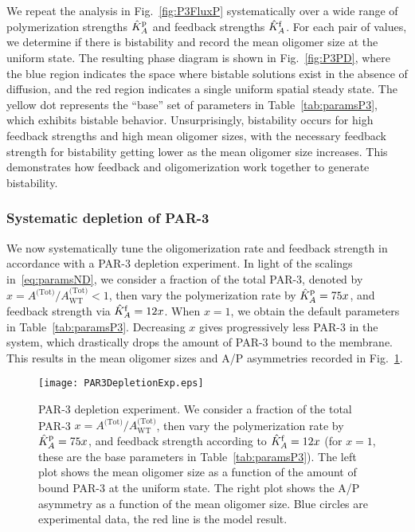 \documentclass[11pt]{article}
\newcommand{\6}[1]{#1_{\text{6}}}
\newcommand{\3}[1]{#1_{\text{3}}}
\newcommand{\Tot}[1]{#1^\text{(Tot)}}
\begin{document}
We repeat the analysis in Fig.\ \ref{fig:P3FluxP} systematically over a wide range of polymerization strengths $\hat{K}^\text{p}_A$ and feedback strengths $\hat{K}^\text{f}_A$. For each pair of values, we determine if there is bistability and record the mean oligomer size at the uniform state. The resulting phase diagram is shown in Fig.\ \ref{fig:P3PD}, where the blue region indicates the space where bistable solutions exist in the absence of diffusion, and the red region indicates a single uniform spatial steady state. The yellow dot represents the ``base'' set of parameters in Table\ \ref{tab:paramsP3}, which exhibits bistable behavior. Unsurprisingly, bistability occurs for high feedback strengths and high mean oligomer sizes, with the necessary feedback strength for bistability getting lower as the mean oligomer size increases. This demonstrates how feedback and oligomerization work together to generate bistability. 

\subsubsection{Systematic depletion of PAR-3}
We now systematically tune the oligomerization rate and feedback strength in accordance with a PAR-3 depletion experiment. In light of the scalings in\ \eqref{eq:paramsND}, we consider a fraction of the total PAR-3, denoted by $x=\Tot{A}/\Tot{A}_\text{WT} < 1$, then vary the polymerization rate by $\hat{K}^\text{p}_A=75x$, and feedback strength via $\hat{K}^\text{f}_A=12x$. When $x=1$, we obtain the default parameters in Table\ \ref{tab:paramsP3}. Decreasing $x$ gives progressively less PAR-3 in the system, which drastically drops the amount of PAR-3 bound to the membrane. This results in the mean oligomer sizes and A/P asymmetries recorded in Fig.\ \ref{fig:P3Depl}. 

\begin{figure}
\centering
\texttt{[image: PAR3DepletionExp.eps]}
\caption{\label{fig:P3Depl}PAR-3 depletion experiment. We consider a fraction of the total PAR-3 $x=\Tot{A}/\Tot{A}_\text{WT}$, then vary the polymerization rate by $\hat{K}^\text{p}_A=75x$, and feedback strength according to $\hat{K}^\text{f}_A=12x$ (for $x=1$, these are the base parameters in Table\ \ref{tab:paramsP3}). The left plot shows the mean oligomer size as a function of the amount of bound PAR-3 at the uniform state. The right plot shows the A/P asymmetry as a function of the mean oligomer size. Blue circles are experimental data, the red line is the model result.}
\end{figure}
\end{document}

